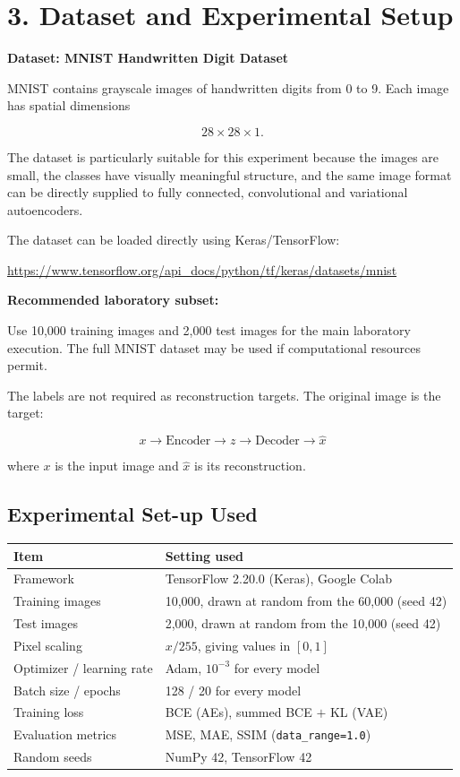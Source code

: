 \documentclass[10pt]{article}
\begin{document}
\section*{3. Dataset and Experimental Setup}

\textbf{Dataset: MNIST Handwritten Digit Dataset}

MNIST contains grayscale images of handwritten digits from 0 to 9. Each image
has spatial dimensions

\[
28\times28\times1.
\]

The dataset is particularly suitable for this experiment because the images
are small, the classes have visually meaningful structure, and the same image
format can be directly supplied to fully connected, convolutional and
variational autoencoders.

The dataset can be loaded directly using Keras/TensorFlow:

\url{https://www.tensorflow.org/api_docs/python/tf/keras/datasets/mnist}

\textbf{Recommended laboratory subset:}

Use 10,000 training images and 2,000 test images for the main laboratory
execution. The full MNIST dataset may be used if computational resources
permit.

The labels are not required as reconstruction targets. The original image is
the target:

\[
\boxed{x\rightarrow \text{Encoder}\rightarrow z
\rightarrow\text{Decoder}\rightarrow\hat{x}}
\]

where $x$ is the input image and $\hat{x}$ is its reconstruction.

\subsection*{Experimental Set-up Used}

\begin{center}
\begin{tabular}{|l|l|}
\hline
Item & Setting used\\
\hline
Framework & TensorFlow 2.20.0 (Keras), Google Colab\\
Training images & 10,000, drawn at random from the 60,000 (seed 42)\\
Test images & 2,000, drawn at random from the 10,000 (seed 42)\\
Pixel scaling & $x/255$, giving values in $[0,1]$\\
Optimizer / learning rate & Adam, $10^{-3}$ for every model\\
Batch size / epochs & 128 / 20 for every model\\
Training loss & BCE (AEs), summed BCE $+$ KL (VAE)\\
Evaluation metrics & MSE, MAE, SSIM (\texttt{data\_range=1.0})\\
Random seeds & NumPy 42, TensorFlow 42\\
\hline
\end{tabular}
\end{center}
\end{document}
